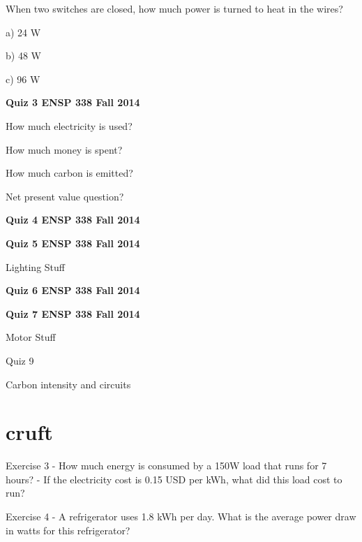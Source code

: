 \documentclass[12pt, oneside]{article}
\begin{document}
\problem{}
When two switches are closed, how much power is turned to heat in the
wires?

a) 24 W

b) 48 W

c) 96 W



\newpage
{\bf Quiz 3 \hfill ENSP 338 \hfill Fall 2014}

\problem{}
How much electricity is used?

\problem{}
How much money is spent?

\problem{}
How much carbon is emitted?

\problem{}
Net present value question?


\newpage
{\bf Quiz 4 \hfill ENSP 338 \hfill Fall 2014}



\newpage
{\bf Quiz 5 \hfill ENSP 338 \hfill Fall 2014}

Lighting Stuff


\newpage
{\bf Quiz 6 \hfill ENSP 338 \hfill Fall 2014}




\newpage
{\bf Quiz 7 \hfill ENSP 338 \hfill Fall 2014}

Motor Stuff



\newpage
Quiz 9

Carbon intensity and circuits

\newpage
\section{cruft}

Exercise 3
- How much energy is consumed by a 150W load that runs for 7 hours?
- If the electricity cost is 0.15 USD per kWh, what did this load cost to run?

Exercise 4
- A refrigerator uses 1.8 kWh per day.  What is the average power draw
  in watts for this refrigerator?
\end{document}
